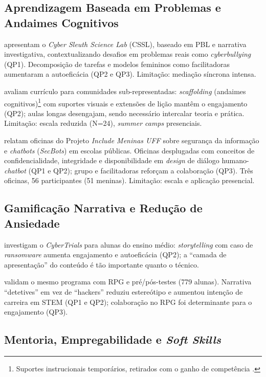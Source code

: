 \documentclass[12pt]{article}
\begin{document}
\subsection{Aprendizagem Baseada em Problemas e Andaimes Cognitivos}

 apresentam o \textit{Cyber Sleuth Science Lab} (CSSL), baseado em PBL e narrativa investigativa, contextualizando desafios em problemas reais como \textit{cyberbullying} (QP1). Decomposição de tarefas e modelos femininos como facilitadoras aumentaram a autoeficácia (QP2 e QP3). Limitação: mediação síncrona intensa.

 avaliam currículo para comunidades sub-representadas: \textit{scaffolding} (andaimes cognitivos)\footnote{Suportes instrucionais temporários, retirados com o ganho de competência \cite{Wood1976}.} com suportes visuais e extensões de lição mantêm o engajamento (QP2); aulas longas desengajam, sendo necessário intercalar teoria e prática. Limitação: escala reduzida (N=24), \textit{summer camps} presenciais.

 relatam oficinas do Projeto \textit{Include Meninas UFF} sobre segurança da informação e \textit{chatbots} (\textit{SecBots}) em escolas públicas. Oficinas desplugadas com conceitos de confidencialidade, integridade e disponibilidade em \textit{design} de diálogo humano-\textit{chatbot} (QP1 e QP2); grupo e facilitadoras reforçam a colaboração (QP3). Três oficinas, 56 participantes (51 meninas). Limitação: escala e aplicação presencial.

\subsection{Gamificação Narrativa e Redução de Ansiedade}

 investigam o \textit{CyberTrials} para alunas do ensino médio: \textit{storytelling} com caso de \textit{ransomware} aumenta engajamento e autoeficácia (QP2); a ``camada de apresentação'' do conteúdo é tão importante quanto o técnico.

 validam o mesmo programa com RPG e pré/pós-testes (779 alunas). Narrativa ``detetives'' em vez de ``hackers'' reduziu estereótipo e aumentou intenção de carreira em STEM (QP1 e QP2); colaboração no RPG foi determinante para o engajamento (QP3).

\subsection{Mentoria, Empregabilidade e \textit{Soft Skills}}
\end{document}
